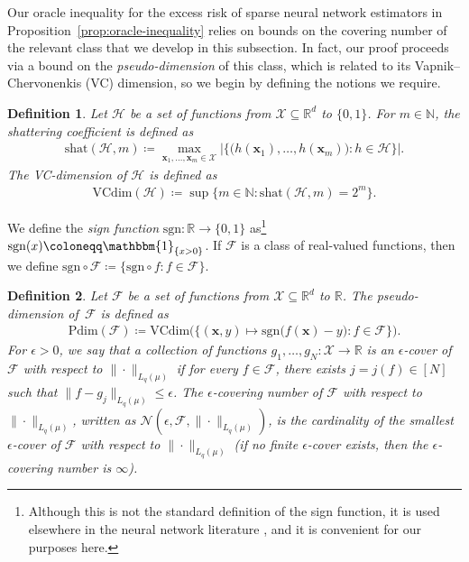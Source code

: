 \documentclass[12pt]{article}
\newtheorem{defn}{Definition}
\begin{document}
Our oracle inequality for the excess risk of sparse neural network estimators in Proposition~\ref{prop:oracle-inequality} relies on bounds on the covering number of the relevant class that we develop in this subsection.  In fact, our proof proceeds via a bound on the \emph{pseudo-dimension} of this class, which is related to its Vapnik--Chervonenkis (VC) dimension, so we begin by defining the notions we require.
\begin{defn}
    Let $\mathcal{H}$ be a set of functions from $\mathcal{X}\subseteq\mathbb{R}^d$ to $\{0,1\}$. For $m\in\mathbb{N}$, the \emph{shattering coefficient} is defined as
    \begin{align*}
        \mathrm{shat}(\mathcal{H},m) \coloneqq \max_{\bm{x}_1,\ldots,\bm{x}_m \in \mathcal{X}} \bigl| \bigl\{\bigl(h(\bm{x}_1), \ldots, h(\bm{x}_m)\bigr) : h\in\mathcal{H}\bigr\} \bigr|.
    \end{align*}
    The \emph{VC-dimension} of $\mathcal{H}$ is defined as
    \begin{align*}
        \mathrm{VCdim}(\mathcal{H}) \coloneqq \sup \{m\in\mathbb{N} : \mathrm{shat}(\mathcal{H},m) = 2^m\}.
    \end{align*}
\end{defn}

We define the \emph{sign function} $\mathrm{sgn} : \mathbb{R} \to \{0,1\}$ as\footnote{Although this is not the standard definition of the sign function, it is used elsewhere in the neural network literature \citep[e.g.][]{bartlett2019nearly}, and it is convenient for our purposes here.} $\mathrm{sgn}(x) \coloneqq \mathbbm{1}_{\{x>0\}}$. If $\mathcal{F}$ is a class of real-valued functions, then we define $\mathrm{sgn}\circ\mathcal{F} \coloneqq \{\mathrm{sgn}\circ f : f\in\mathcal{F}\}$.
\begin{defn}
    Let $\mathcal{F}$ be a set of functions from $\mathcal{X}\subseteq\mathbb{R}^d$ to $\mathbb{R}$. The \emph{pseudo-dimension} of~$\mathcal{F}$ is defined as
    \begin{align*}
        \mathrm{Pdim}(\mathcal{F}) \coloneqq \mathrm{VCdim}\bigl( \bigl\{(\bm{x},y) \mapsto \mathrm{sgn}\bigl(f(\bm{x})-y\bigr) : f\in\mathcal{F}\bigr\} \bigr).
    \end{align*}
    For $\epsilon>0$, we say that a collection of functions $g_1,\ldots,g_N:\mathcal{X}\to\mathbb{R}$ is an \emph{$\epsilon$-cover} of~$\mathcal{F}$ with respect to $\|\cdot\|_{L_q(\mu)}$ if for every $f\in\mathcal{F}$, there exists $j=j(f) \in [N]$ such that $\|f-g_j\|_{L_q(\mu)} \leq \epsilon$. The \emph{$\epsilon$-covering number} of $\mathcal{F}$ with respect to $\|\cdot\|_{L_q(\mu)}$, written as $\mathcal{N}(\epsilon,\mathcal{F},\|\cdot\|_{L_q(\mu)})$, is the cardinality of the smallest $\epsilon$-cover of $\mathcal{F}$ with respect to $\|\cdot\|_{L_q(\mu)}$ (if no finite $\epsilon$-cover exists, then the $\epsilon$-covering number is $\infty$).
\end{defn}
\end{document}
